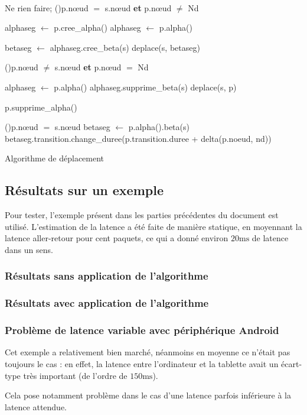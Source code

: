\begin{algorithm}[H]
	\SetAlgoLined
	
	~ \\
	
	{
		{
			Ne rien faire;	
		}
		\uSinonSi(){p.nœud $=$ s.nœud \textbf{et} p.nœud $\neq$ Nd}
		{
			{
				alphaseg $\longleftarrow$ p.cree\_alpha()\;
			}
			\Sinon
			{
				alphaseg $\longleftarrow$ p.alpha()\;
			}
			
			betaseg $\longleftarrow$ alphaseg.cree\_beta(s)\;
			deplace(s, betaseg)\;
					
		}
		\uSinonSi(){p.nœud $\neq$ s.nœud \textbf{et} p.nœud $=$ Nd}
		{
			alphaseg $\longleftarrow$ p.alpha()\;
			alphaseg.supprime\_beta(s)\;
			deplace(s, p) \;
					
			{
				p.supprime\_alpha()\;
			}		
		}
		\SinonSi(){p.nœud $=$ s.nœud}
		{
			betaseg $\longleftarrow$ p.alpha().beta(s)\;
			betaseg.transition.change\_duree(p.transition.duree + delta(p.noeud, nd))\;
		}	
	}
	
	\caption{Algorithme de déplacement}
	\label{alg.deplacement}
\end{algorithm}

\subsection{Résultats sur un exemple}
Pour tester, l'exemple présent dans les parties précédentes du document est utilisé. L'estimation de la latence a été faite de manière statique, en moyennant la latence aller-retour pour cent paquets, ce qui a donné environ $\num{20} \si{\milli\second}$ de latence dans un sens.

\subsubsection{Résultats sans application de l'algorithme}

\subsubsection{Résultats avec application de l'algorithme}


\subsubsection{Problème de latence variable avec périphérique Android}
Cet exemple a relativement bien marché, néanmoins en moyenne ce n'était pas toujours le cas : en effet, la latence entre l'ordinateur et la tablette  avait un écart-type très important (de l'ordre de $\num{150} \si{\milli\second}$).

Cela pose notamment problème dans le cas d'une latence parfois inférieure à la latence attendue.
